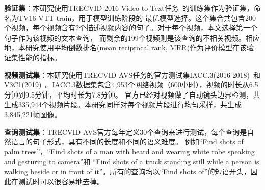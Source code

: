 \textbf{验证集}：本研究使用TRECVID 2016 Video-to-Text任务~\cite{}的训练集作为验证集，命名为TV16-VTT-train，用于模型训练阶段的
最优模型选择。这个集合共包含200个视频，每个视频含有2个描述视频内容的句子。对于每个视频，本文选择第一个句子作为该视频的文本查询，
而剩余的199个视频则是该查询的不相关视频。相应地，本研究使用平均倒数排名(mean reciprocal rank, MRR)作为评价模型在该验证集性能的指标。
\begin{table} [tbh!]
    \caption[AVS数据集]{这是AVS数据集的基本统计描述}
    \label{tab:avs-dataset}
    \centering
\end{table}


\textbf{视频测试集}：本研究使用TRECVID AVS任务的官方测试集IACC.3(2016-2018)~\cite{}和V3C1(2019)~\cite{}。IACC.3数据集包含4,953个网络视频（600小时），视频的时长从6.5分钟到9.5分钟，平均时长为7.8分钟。
官方已经对视频做了自动镜头边界检测，共生成335,944个视频片段。本研究同样对每个视频片段进行均匀采样，共生成3,845,221帧图像。

\textbf{查询测试集}：TRECVID AVS官方每年定义30个查询来进行测试，每个查询是自然语言的句子形式，具有不同的长度和不同的语义难度。
例如“Find shots of palm trees”，“Find shots of a man with beard and wearing white robe speaking and gesturing to camera”和
“Find shots of a truck standing still while a person is walking beside or in front of it”。所有的查询均以“Find shots of”的短语开头，因此在测试时可以很容易地去掉。

